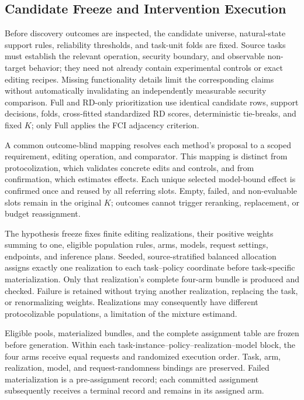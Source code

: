 \subsection{Candidate Freeze and Intervention Execution}
\label{app:intervention-details}

Before discovery outcomes are inspected, the candidate universe, natural-state
support rules, reliability thresholds, and task-unit folds are fixed. Source
tasks must establish the relevant operation, security boundary, and observable
non-target behavior; they need not already contain experimental controls or
exact editing recipes. Missing functionality details limit the corresponding
claims without automatically invalidating an independently measurable security
comparison. Full and RD-only prioritization use identical candidate rows,
support decisions, folds, cross-fitted standardized RD scores, deterministic
tie-breaks, and fixed $K$; only Full applies the FCI adjacency criterion.

A common outcome-blind mapping resolves each method's proposal to a scoped
requirement, editing operation, and comparator. This mapping is distinct from
protocolization, which validates concrete edits and controls, and from
confirmation, which estimates effects. Each unique selected model-bound effect
is confirmed once and reused by all referring slots. Empty, failed, and
non-evaluable slots remain in the original $K$; outcomes cannot trigger
reranking, replacement, or budget reassignment.

The hypothesis freeze fixes finite editing realizations, their positive weights
summing to one, eligible population rules, arms, models, request settings,
endpoints, and inference plans. Seeded, source-stratified balanced allocation
assigns exactly one realization to each task--policy coordinate before
task-specific materialization. Only that realization's complete four-arm bundle
is produced and checked. Failure is retained without trying another realization,
replacing the task, or renormalizing weights. Realizations may consequently have
different protocolizable populations, a limitation of the mixture estimand.

Eligible pools, materialized bundles, and the complete assignment table are
frozen before generation. Within each task-instance--policy--realization--model
block, the four arms receive equal requests and randomized execution order.
Task, arm, realization, model, and request-randomness bindings are preserved.
Failed materialization is a pre-assignment record; each committed assignment
subsequently receives a terminal record and remains in its assigned arm.

